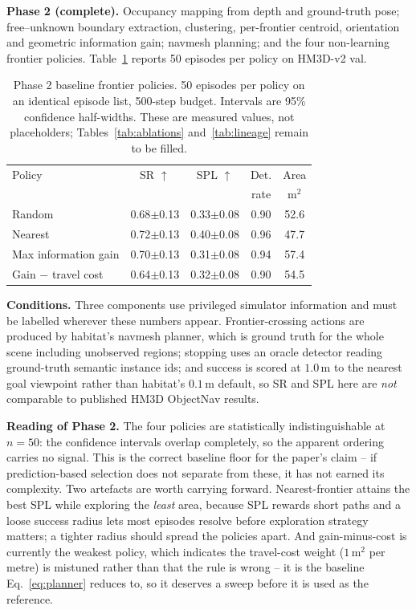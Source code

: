 \documentclass[10pt,twocolumn]{article}
\begin{document}
\textbf{Phase 2 (complete).} Occupancy mapping from depth and ground-truth
pose; free--unknown boundary extraction, clustering, per-frontier centroid,
orientation and geometric information gain; navmesh planning; and the four
non-learning frontier policies. Table~\ref{tab:phase2} reports 50 episodes per
policy on HM3D-v2 val.

\begin{table}[h]
\centering
\footnotesize
\setlength{\tabcolsep}{3pt}
\caption{Phase 2 baseline frontier policies. 50 episodes per policy on an
identical episode list, 500-step budget. Intervals are 95\% confidence
half-widths. These are measured values, not placeholders; Tables~\ref{tab:ablations}
and~\ref{tab:lineage} remain to be filled.}
\label{tab:phase2}
\begin{tabular}{lcccc}
\toprule
Policy & SR \(\uparrow\) & SPL \(\uparrow\) & Det. & Area\\
       &                 &                  & rate & m\(^2\)\\
\midrule
Random               & 0.68\(\pm\)0.13 & 0.33\(\pm\)0.08 & 0.90 & 52.6\\
Nearest              & 0.72\(\pm\)0.13 & 0.40\(\pm\)0.08 & 0.96 & 47.7\\
Max information gain & 0.70\(\pm\)0.13 & 0.31\(\pm\)0.08 & 0.94 & 57.4\\
Gain \(-\) travel cost & 0.64\(\pm\)0.13 & 0.32\(\pm\)0.08 & 0.90 & 54.5\\
\bottomrule
\end{tabular}
\end{table}

\textbf{Conditions.} Three components use privileged simulator information and
must be labelled wherever these numbers appear. Frontier-crossing actions are
produced by habitat's navmesh planner, which is ground truth for the whole
scene including unobserved regions; stopping uses an oracle detector reading
ground-truth semantic instance ids; and success is scored at
\(1.0\,\mathrm{m}\) to the nearest goal viewpoint rather than habitat's
\(0.1\,\mathrm{m}\) default, so SR and SPL here are \emph{not} comparable to
published HM3D ObjectNav results.

\textbf{Reading of Phase 2.} The four policies are statistically
indistinguishable at \(n=50\): the confidence intervals overlap completely, so
the apparent ordering carries no signal. This is the correct baseline floor
for the paper's claim -- if prediction-based selection does not separate from
these, it has not earned its complexity. Two artefacts are worth carrying
forward. Nearest-frontier attains the best SPL while exploring the
\emph{least} area, because SPL rewards short paths and a loose success radius
lets most episodes resolve before exploration strategy matters; a tighter
radius should spread the policies apart. And gain-minus-cost is currently the
weakest policy, which indicates the travel-cost weight (\(1\,\mathrm{m^2}\)
per metre) is mistuned rather than that the rule is wrong -- it is the
baseline Eq.~\eqref{eq:planner} reduces to, so it deserves a sweep before it
is used as the reference.
\end{document}
